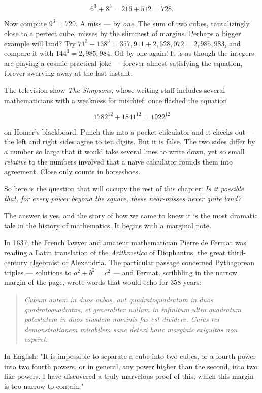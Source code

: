\[6^3 + 8^3 = 216 + 512 = 728.\]

Now compute $9^3 = 729$. A miss --- by \textit{one}. The sum of two cubes, tantalizingly close to a perfect cube, misses by the slimmest of margins. Perhaps a bigger example will land? Try $71^3 + 138^3 = 357{,}911 + 2{,}628{,}072 = 2{,}985{,}983$, and compare it with $144^3 = 2{,}985{,}984$. Off by one again! It is as though the integers are playing a cosmic practical joke --- forever almost satisfying the equation, forever swerving away at the last instant.

The television show \textit{The Simpsons}, whose writing staff includes several mathematicians with a weakness for mischief, once flashed the equation

\[1782^{12} + 1841^{12} = 1922^{12}\]

on Homer's blackboard. Punch this into a pocket calculator and it checks out --- the left and right sides agree to ten digits. But it is false. The two sides differ by a number so large that it would take several lines to write down, yet so small \textit{relative} to the numbers involved that a na\"ive calculator rounds them into agreement. Close only counts in horseshoes.


So here is the question that will occupy the rest of this chapter: \textit{Is it possible that, for every power beyond the square, these near-misses never quite land?}

The answer is yes, and the story of how we came to know it is the most dramatic tale in the history of mathematics. It begins with a marginal note.

In 1637, the French lawyer and amateur mathematician Pierre de Fermat was reading a Latin translation of the \textit{Arithmetica} of Diophantus, the great third-century algebraist of Alexandria. The particular passage concerned Pythagorean triples --- solutions to $a^2 + b^2 = c^2$ --- and Fermat, scribbling in the narrow margin of the page, wrote words that would echo for 358 years:


\begin{quote}
\itshape
\textit{Cubum autem in duos cubos, aut quadratoquadratum in duos quadratoquadratos, et generaliter nullam in infinitum ultra quadratum potestatem in duos eiusdem nominis fas est dividere. Cuius rei demonstrationem mirabilem sane detexi hanc marginis exiguitas non caperet.}
\end{quote}


In English: "It is impossible to separate a cube into two cubes, or a fourth power into two fourth powers, or in general, any power higher than the second, into two like powers. I have discovered a truly marvelous proof of this, which this margin is too narrow to contain."


